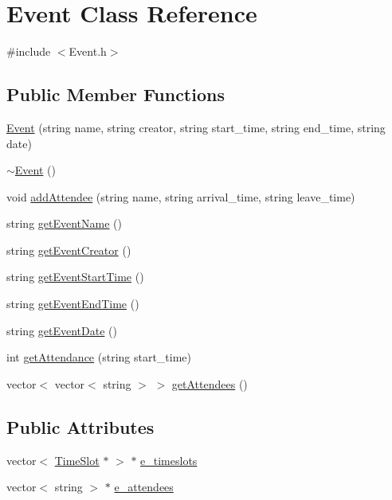 \hypertarget{class_event}{}\section{Event Class Reference}
\label{class_event}


{\ttfamily \#include $<$Event.\+h$>$}

\subsection*{Public Member Functions}
\begin{DoxyCompactItemize}
\item 
\hyperlink{class_event_ac53d5eea0fae7018bfc240544c99bec0}{Event} (string name, string creator, string start\+\_\+time, string end\+\_\+time, string date)
\item 
\hyperlink{class_event_a7704ec01ce91e673885792054214b3d2}{$\sim$\+Event} ()
\item 
void \hyperlink{class_event_a88bba1204c92cc12830981c04a8c3a51}{add\+Attendee} (string name, string arrival\+\_\+time, string leave\+\_\+time)
\item 
string \hyperlink{class_event_ab13410739cd27089f2f9f56b60f18836}{get\+Event\+Name} ()
\item 
string \hyperlink{class_event_adc4d66c8a57d4e94b483ba39bbf0cf6c}{get\+Event\+Creator} ()
\item 
string \hyperlink{class_event_a9c77702f7c3d0246379b89f90f175774}{get\+Event\+Start\+Time} ()
\item 
string \hyperlink{class_event_a2d87965673185f8b5be533b67ac41deb}{get\+Event\+End\+Time} ()
\item 
string \hyperlink{class_event_a91ec497b9aad58f22638b673a90f6cb9}{get\+Event\+Date} ()
\item 
int \hyperlink{class_event_a3e79358d2835bfd9dc83da17110ef69b}{get\+Attendance} (string start\+\_\+time)
\item 
vector$<$ vector$<$ string $>$ $>$ \hyperlink{class_event_aa2e514e796817604909d189f16d12cec}{get\+Attendees} ()
\end{DoxyCompactItemize}
\subsection*{Public Attributes}
\begin{DoxyCompactItemize}
\item 
vector$<$ \hyperlink{class_time_slot}{Time\+Slot} $\ast$ $>$ $\ast$ \hyperlink{class_event_a1d8d11d893c1149b3518aa332172b26e}{e\+\_\+timeslots}
\item 
vector$<$ string $>$ $\ast$ \hyperlink{class_event_a2c3f28f20c869c6dcc70d863fcf302ef}{e\+\_\+attendees}
\end{DoxyCompactItemize}
